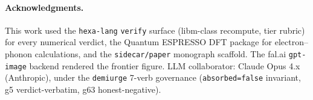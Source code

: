\documentclass[11pt,a4paper]{article}
\newcommand{\tierBlue}{\textcolor{blue!60!black}{[\textsc{formal}]}}
\newcommand{\tierGreen}{\textcolor{teal}{[\textsc{green}]}}
\begin{document}
\paragraph{Acknowledgments.}
This work used the \texttt{hexa-lang} \texttt{verify} surface (libm-class
recompute, tier rubric) for every numerical verdict, the Quantum ESPRESSO
DFT package for electron--phonon calculations, and the \texttt{sidecar/paper}
monograph scaffold. The fal.ai \texttt{gpt-image} backend rendered the
frontier figure. LLM collaborator: Claude Opus 4.x (Anthropic), under the
\texttt{demiurge} 7-verb governance (\texttt{absorbed=false} invariant, g5
verdict-verbatim, g63 honest-negative).




%
%
%


\appendix







\end{document}

